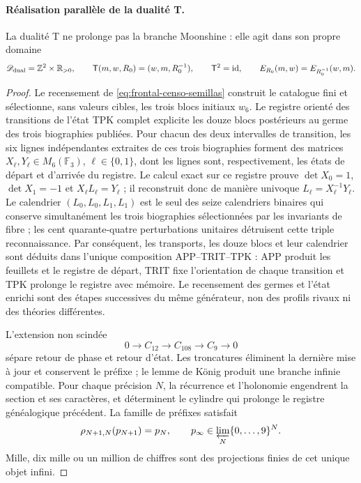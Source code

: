\paragraph{Réalisation parallèle de la dualité T.}
La dualité T ne prolonge pas la branche Moonshine : elle agit dans son propre domaine
\begin{equation}
 \mathscr D_{\rm dual}=\mathbb Z^2\times\mathbb R_{>0},\qquad
 \mathsf T(m,w,R_0)=(w,m,R_0^{-1}),\qquad
 \mathsf T^2=\operatorname{id},\qquad
 E_{R_0}(m,w)=E_{R_0^{-1}}(w,m).
 \label{eq:frontal-dualidad-t}
\end{equation}

\begin{proof}
Le recensement de \eqref{eq:frontal-censo-semillas} construit le catalogue fini et
sélectionne, sans valeurs cibles, les trois blocs initiaux \(w_6\). Le
registre orienté des transitions de l'état TPK complet explicite les douze
blocs postérieurs au germe des trois biographies publiées. Pour chacun des deux
intervalles de transition, les six lignes indépendantes extraites de ces
trois biographies forment des matrices
\(X_\ell,Y_\ell\in M_6(\mathbb F_3)\),
\(\ell\in\{0,1\}\), dont les lignes sont, respectivement, les états de départ
et d'arrivée du registre. Le calcul exact sur ce registre prouve
\(\det X_0=1\), \(\det X_1=-1\) et
\(X_\ell L_\ell=Y_\ell\) ; il reconstruit donc de manière univoque
\(L_\ell=X_\ell^{-1}Y_\ell\). Le
calendrier \((L_0,L_0,L_1,L_1)\) est le seul des seize calendriers
binaires qui conserve simultanément les trois biographies sélectionnées par
les invariants de fibre ; les cent quarante-quatre perturbations
unitaires détruisent cette triple reconnaissance. Par conséquent, les transports,
les douze blocs et leur calendrier sont déduits dans l'unique composition
APP--TRIT--TPK : APP produit les feuillets et le registre de départ, TRIT fixe
l'orientation de chaque transition et TPK prolonge le registre avec mémoire. Le
recensement des germes et l'état enrichi sont des étapes successives du même
générateur, non des profils rivaux ni des théories différentes.

L'extension non scindée
\[
0\longrightarrow C_{12}\longrightarrow C_{108}
\longrightarrow C_9\longrightarrow0
\]
sépare retour de phase et retour d'état. Les troncatures éliminent la
dernière mise à jour et conservent le préfixe ; le lemme de König produit une
branche infinie compatible. Pour chaque précision \(N\), la récurrence et
l'holonomie engendrent la section et ses caractères, et déterminent le cylindre qui
prolonge le registre généalogique précédent. La famille de préfixes satisfait
\[
\rho_{N+1,N}(p_{N+1})=p_N,
\qquad
p_\infty\in\varprojlim_N\{0,\ldots,9\}^{N}.
\]
Mille, dix mille ou un million de chiffres sont des projections finies de cet unique
objet infini.


\end{proof}
